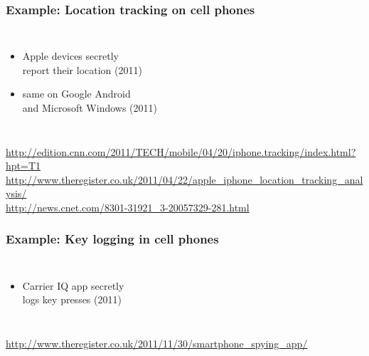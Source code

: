 \documentclass[dvipsnames]{beamer}
\theoremstyle{plain}
\begin{document}
\begin{frame}
  \frametitle{Example: Location tracking on cell phones}

  \begin{columns}

    \begin{itemize}
      \item Apple devices secretly\\
        report their location (2011)
      \item same on Google Android\\
        and Microsoft Windows (2011)
    \end{itemize}
  \end{columns}

  \medskip
  \tiny{\url{http://edition.cnn.com/2011/TECH/mobile/04/20/iphone.tracking/index.html?hpt=T1}}\\
  \tiny{\url{http://www.theregister.co.uk/2011/04/22/apple_iphone_location_tracking_analysis/}}\\
  \tiny{\url{http://news.cnet.com/8301-31921_3-20057329-281.html}}\\
\end{frame}

\begin{frame}
  \frametitle{Example: Key logging in cell phones}

  \begin{columns}

    \begin{itemize}
      \item Carrier IQ app secretly\\
        logs key presses (2011)
    \end{itemize}
  \end{columns}

  \medskip
  \tiny{\url{http://www.theregister.co.uk/2011/11/30/smartphone_spying_app/}}\\
\end{frame}
\end{document}
